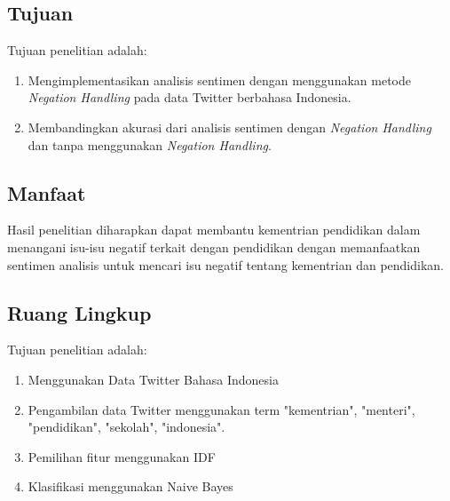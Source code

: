 \subsection*{Tujuan}
Tujuan penelitian adalah:
\begin{enumerate}[noitemsep] 
	\item Mengimplementasikan analisis sentimen dengan menggunakan metode \textit{Negation Handling} pada data Twitter berbahasa Indonesia.
	\item Membandingkan akurasi dari analisis sentimen dengan \textit{Negation Handling} dan tanpa menggunakan \textit{Negation Handling}.
\end{enumerate}

\subsection*{Manfaat}

Hasil penelitian diharapkan dapat membantu kementrian pendidikan dalam menangani isu-isu negatif terkait dengan pendidikan dengan memanfaatkan sentimen analisis untuk mencari isu negatif tentang kementrian dan pendidikan.

\subsection*{Ruang Lingkup}
Tujuan penelitian adalah:
\begin{enumerate}[noitemsep] 
	\item Menggunakan Data Twitter Bahasa Indonesia
	\item Pengambilan data Twitter menggunakan term "kementrian", "menteri", "pendidikan", "sekolah", "indonesia".
	\item Pemilihan fitur menggunakan IDF
	\item Klasifikasi menggunakan Naive Bayes
\end{enumerate}